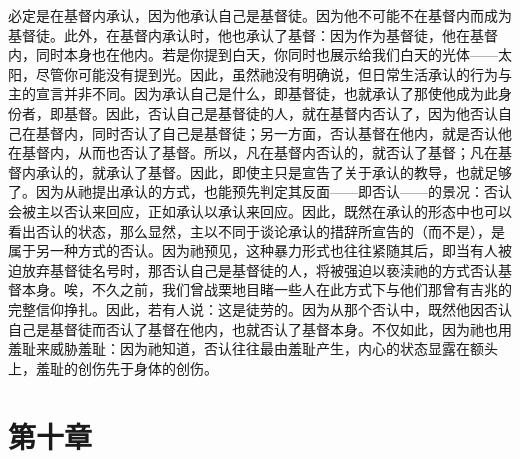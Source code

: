 必定是在基督内承认，因为他承认自己是基督徒。因为他不可能不在基督内而成为基督徒。此外，在基督内承认时，他也承认了基督：因为作为基督徒，他在基督内，同时本身也在他内。若是你提到白天，你同时也展示给我们白天的光体——太阳，尽管你可能没有提到光。因此，虽然祂没有明确说，但日常生活承认的行为与主的宣言并非不同。因为承认自己是什么，即基督徒，也就承认了那使他成为此身份者，即基督。因此，否认自己是基督徒的人，就在基督内否认了，因为他否认自己在基督内，同时否认了自己是基督徒；另一方面，否认基督在他内，就是否认他在基督内，从而也否认了基督。所以，凡在基督内否认的，就否认了基督；凡在基督内承认的，就承认了基督。因此，即使主只是宣告了关于承认的教导，也就足够了。因为从祂提出承认的方式，也能预先判定其反面——即否认——的景况：否认会被主以否认来回应，正如承认以承认来回应。因此，既然在承认的形态中也可以看出否认的状态，那么显然，主以不同于谈论承认的措辞所宣告的（而不是），是属于另一种方式的否认。因为祂预见，这种暴力形式也往往紧随其后，即当有人被迫放弃基督徒名号时，那否认自己是基督徒的人，将被强迫以亵渎祂的方式否认基督本身。唉，不久之前，我们曾战栗地目睹一些人在此方式下与他们那曾有吉兆的完整信仰挣扎。因此，若有人说：这是徒劳的。因为从那个否认中，既然他因否认自己是基督徒而否认了基督在他内，也就否认了基督本身。不仅如此，因为祂也用羞耻来威胁羞耻：因为祂知道，否认往往最由羞耻产生，内心的状态显露在额头上，羞耻的创伤先于身体的创伤。\par


\section{第十章}

